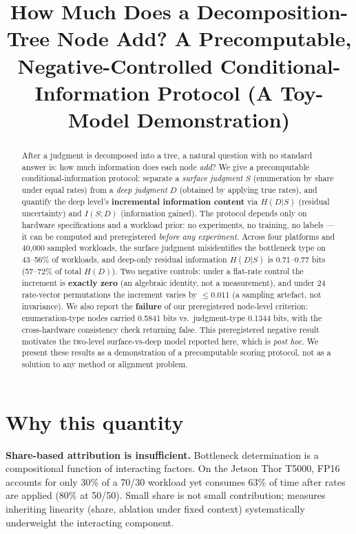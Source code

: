 \documentclass[10pt]{article}
\title{How Much Does a Decomposition-Tree Node Add? A Precomputable, Negative-Controlled Conditional-Information Protocol (A Toy-Model Demonstration)}
\begin{document}
\maketitle

\begin{abstract}
After a judgment is decomposed into a tree, a natural question with no standard answer is: how much information does each node \emph{add}? We give a precomputable conditional-information protocol: separate a \emph{surface judgment} $S$ (enumeration by share under equal rates) from a \emph{deep judgment} $D$ (obtained by applying true rates), and quantify the deep level's \textbf{incremental information content} via $H(D|S)$ (residual uncertainty) and $I(S;D)$ (information gained). The protocol depends only on hardware specifications and a workload prior: no experiments, no training, no labels --- it can be computed and preregistered \emph{before any experiment}. Across four platforms and 40,000 sampled workloads, the surface judgment misidentifies the bottleneck type on 43--56\% of workloads, and deep-only residual information $H(D|S)$ is 0.71--0.77 bits (57--72\% of total $H(D)$). Two negative controls: under a flat-rate control the increment is \textbf{exactly zero} (an algebraic identity, not a measurement), and under 24 rate-vector permutations the increment varies by $\leq 0.011$ (a sampling artefact, not invariance). We also report the \textbf{failure} of our preregistered node-level criterion: enumeration-type nodes carried 0.5841 bits vs.\ judgment-type 0.1344 bits, with the cross-hardware consistency check returning false. This preregistered negative result motivates the two-level surface-vs-deep model reported here, which is \emph{post hoc}. We present these results as a demonstration of a precomputable scoring protocol, not as a solution to any method or alignment problem.
\end{abstract}

\section{Why this quantity}\label{why-this-quantity}

\textbf{Share-based attribution is insufficient.} Bottleneck determination is a compositional function of interacting factors. On the Jetson Thor T5000, FP16 accounts for only 30\% of a 70/30 workload yet consumes 63\% of time after rates are applied (80\% at 50/50). Small share is not small contribution; measures inheriting linearity (share, ablation under fixed context) systematically underweight the interacting component.
\end{document}
